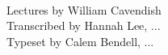 \begin{titlepage}

\begin{addmargin}[-1cm]{-3cm}
\begin{center}
\large

\hfill
\vfill

\begingroup
\color{Maroon}{\LARGE\textsc Maths 223 \\ \Large Lecture Notes Winter 2014} \\ \bigskip %
\endgroup

\vfill

Lectures by William Cavendish \\
Transcribed by Hannah Lee, ... \\
Typeset by Calem Bendell, ...

\vfill

\end{center}
\end{addmargin}

\end{titlepage}